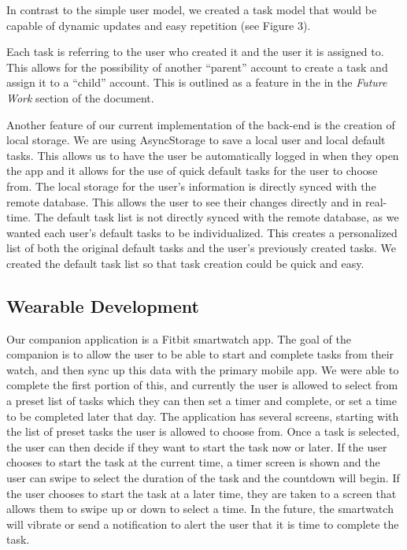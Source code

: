 \documentclass{sigchi}
\begin{document}
In contrast to the simple user model, we created a task model that would be
capable of dynamic updates and easy repetition (see Figure 3).

Each task is referring to the user who created it and the user it is assigned
to. This allows for the possibility of another ``parent'' account to create a
task and assign it to a ``child'' account. This is outlined as a feature in the
in the \textit{Future Work} section of the document.

Another feature of our current implementation of the back-end is the creation
of local storage. We are using AsyncStorage to save a local user and local
default tasks. This allows us to have the user be automatically logged in when
they open the app and it allows for the use of quick default tasks for the user
to choose from. The local storage for the user’s information is directly synced
with the remote database. This allows the user to see their changes directly
and in real-time. The default task list is not directly synced with the remote
database, as we wanted each user’s default tasks to be individualized. This
creates a personalized list of both the original default tasks and the user’s
previously created tasks. We created the default task list so that task
creation could be quick and easy.

\subsection{Wearable Development}
Our companion application is a Fitbit smartwatch app. The goal of the companion
is to allow the user to be able to start and complete tasks from their watch,
and then sync up this data with the primary mobile app. We were able to complete
the first portion of this, and currently the user is allowed to select from a
preset list of tasks which they can then set a timer and complete, or set a
time to be completed later that day. The application has several screens,
starting with the list of preset tasks the user is allowed to choose from. Once
a task is selected, the user can then decide if they want to start the task
now or later. If the user chooses to start the task at the current time, a
timer screen is shown and the user can swipe to select the duration of the task
and the countdown will begin. If the user chooses to start the task at a later
time, they are taken to a screen that allows them to swipe up or down to select
a time. In the future, the smartwatch will vibrate or send a notification to
alert the user that it is time to complete the task.
\end{document}
